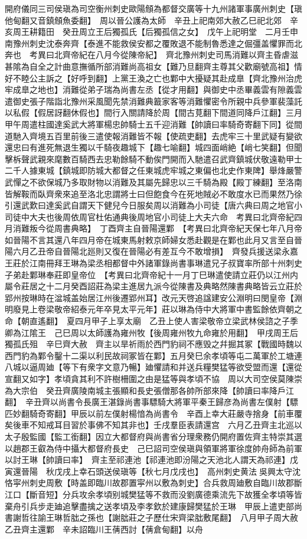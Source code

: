 開府儀同三司侯瑱為司空衡州刺史歐陽頠為都督交廣等十九州諸軍事廣州刺史【瑱他甸翻又音鎮頠魚委翻】　周以晉公護為太師　辛丑上祀南郊大赦乙巳祀北郊　辛亥周王耕籍田　癸丑周立王后獨孤氏【后獨孤信之女】　戊午上祀明堂　二月壬申南豫州刺史沈泰奔齊【泰進不能救侯安都之覆敗退不能制魯悉達之倔彊盖懼罪而北奔也　考異曰北齊帝紀在八月今從陳帝紀】　齊北豫州刺史司馬消難以齊主昏虐滋甚隂為自全之計曲意撫循所部消難尚高祖女【難乃旦翻齊主尊其父歡廟號高祖】情好不睦公主訴之【好呼到翻】上黨王渙之亡也鄴中大擾疑其赴成臯【齊北豫州治虎牢成臯之地也】消難從弟子瑞為尚書左丞【從才用翻】與御史中丞畢義雲有隙義雲遣御史張子階詣北豫州采風聞先禁消難典籖家客等消難懼密令所親中兵參軍裴藻託以私假【假居訝翻休假也】間行入關請降於周【間古莧翻下間道同降戶江翻】三月甲午周遣柱國達奚武大將軍楊忠帥騎士五千迎消難【帥讀曰率騎奇寄翻下同】從間道馳入齊境五百里前後三遣使報消難皆不報【使疏吏翻】去虎牢三十里武疑有變欲還忠曰有進死無退生獨以千騎夜趣城下【趣七喻翻】城四面峭絶【峭七笑翻】但聞擊柝聲武親來麾數百騎西去忠勒餘騎不動俟門開而入馳遣召武齊鎮城伏敬遠勒甲士二千人據東城【鎮城即防城大都督之任東城虎牢城之東偏也北史作東陴】舉烽嚴警武憚之不欲保城乃多取財物以消難及其屬先歸忠以三千騎為殿【殿丁練翻】至洛南皆解鞍而臥齊衆來追至洛北忠謂將士曰但飽食今在死地賊必不敢度水已而果然乃徐引還武歎曰達奚武自謂天下健兒今日服矣周以消難為小司徒【唐六典曰周之地官小司徒中大夫也後周依周官杜佑通典後周地官小司徒上大夫六命　考異曰北齊帝紀四月消難叛今從周書典略】　丁酉齊主自晉陽還鄴　【考異曰北齊帝紀天保七年八月帝如晉陽不言其還八年四月帝在城東馬射敕京師婦女悉赴觀是在鄴也此月又言至自晉陽六月乙丑帝自晉陽北廵則又復在晉陽必有差互今不敢增損】　齊發兵援送梁永嘉王莊於江南冊拜王琳為梁丞相都督中外諸軍錄尚書事琳遣兄子叔寶率所部十州刺史子弟赴鄴琳奉莊即皇帝位　【考異曰北齊帝紀十一月丁巳琳遣使請立莊仍以江州内屬令莊居之十二月癸酉詔莊為梁主進居九派今從陳書及典略然陳書典略皆云立莊於郢州按琳時在湓城盖始居江州後遷郢州耳】改元天啓追諡建安公淵明曰閔皇帝【淵明廢見上卷梁敬帝紹泰元年卒見太平元年】莊以琳為侍中大將軍中書監餘依齊朝之命【朝直遙翻】　夏四月甲子上享太廟　乙丑上使人害梁敬帝立梁武林侯諮之子季卿為江隂王　己巳周以太師護為雍州牧【後周雍州牧九命雍於用翻】　甲戌周王后獨孤氏殂　辛巳齊大赦　齊主以旱祈雨於西門豹祠不應毁之幷掘其冢【戰國時魏以西門豹為鄴令鑿十二渠以利民故祠冢皆在鄴】五月癸巳余孝頃等屯二萬軍於工塘連八城以逼周廸【等下有衆字文意乃暢】廸懼請和并送兵糧樊猛等欲受盟而還【還從宣翻又如字】孝頃貪其利不許樹柵圍之由是猛等與孝頃不協　周以大司空侯莫陳崇為大宗伯　癸丑齊廣陵南城主張顯和長史張僧那各帥所部來降【帥讀曰率降戶江翻】　辛丑齊以尚書令長廣王湛錄尚書事驃騎大將軍平秦王歸彦為尚書左僕射【驃匹妙翻騎奇寄翻】甲辰以前左僕射楊愔為尚書令　辛酉上幸大莊嚴寺捨身【前車覆矣後車不知戒耳目習於事佛不知其非也】壬戌羣臣表請還宫　六月乙丑齊主北巡以太子殷監國【監工銜翻】因立大都督府與尚書省分理衆務仍開府置佐齊主特崇其選以趙郡王叡為侍中攝大都督府長史　己巳詔司空侯瑱與領軍將軍徐度帥舟師為前軍以討王琳【帥讀曰率】　齊主至祁連池【祁連池即汾陽之天池北人謂天為祁連】戊寅還晉陽　秋戊戌上幸石頭送侯瑱等【秋七月戊戌也】　高州刺史黄法吳興太守沈恪寜州刺史周敷【時盖即臨川故郡置寜州以敷為刺史】合兵救周廸敷自臨川故郡斷江口【斷音短】分兵攻余孝頃别城樊猛等不救而没劉廣德乘流先下故獲全孝頃等皆棄舟引兵步走廸追擊盡擒之送孝頃及李孝欽於建康歸樊猛於王琳　甲辰上遣吏部尚書謝哲往諭王琳哲朏之孫也【謝朏莊之子歷仕宋齊梁朏敷尾翻】　八月甲子周大赦乙丑齊主還鄴　辛未詔臨川王蒨西討【蒨倉甸翻】以舟

